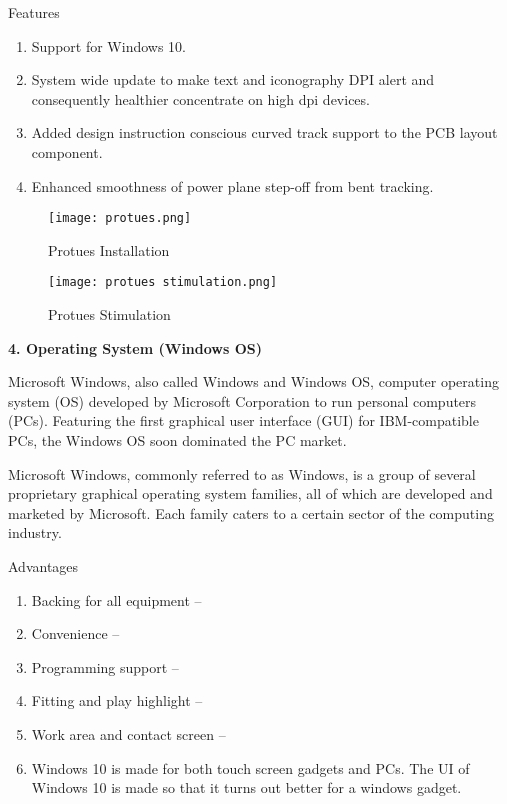 \documentclass[12pt,a4paper]{report}
\begin{document}
\noindent Features 

\begin{enumerate}
\item  Support for Windows 10.

\item  System wide update to make text and iconography DPI alert and consequently healthier concentrate on high dpi devices.

\item  Added design instruction conscious curved track support to the PCB layout component.

\item  Enhanced smoothness of power plane step-off from bent tracking.
\end{enumerate}

\begin{figure}[htp]
    \texttt{[image: protues.png]}
    \caption{Protues Installation}
\end{figure}

\begin{figure}[htp]
    \texttt{[image: protues stimulation.png]}
    \caption{Protues Stimulation}
\end{figure}


\newpage
\noindent\textbf{4. Operating System (Windows OS) }


\noindent 

\noindent Microsoft Windows, also called Windows and Windows OS, computer operating system (OS) developed by Microsoft Corporation to run personal computers (PCs). Featuring the first graphical user interface (GUI) for IBM-compatible PCs, the Windows OS soon dominated the PC market.

\noindent Microsoft Windows, commonly referred to as Windows, is a group of several proprietary graphical operating system families, all of which are developed and marketed by Microsoft. Each family caters to a certain sector of the computing industry.

\noindent 

\noindent Advantages 

\begin{enumerate}
\item  Backing for all equipment --

\item  Convenience --

\item  Programming support --

\item  Fitting and play highlight --

\item  Work area and contact screen --

\item  Windows 10 is made for both touch screen gadgets and PCs. The UI of Windows 10 is made so that it turns out better for a windows gadget.
\end{enumerate}
\end{document}
